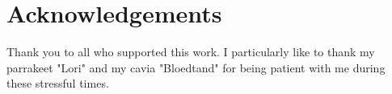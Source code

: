 \chapter*{Acknowledgements}

Thank you to all who supported this work. I particularly like to thank my parrakeet "Lori" and my cavia "Bloedtand" for being patient with me during these stressful times.


